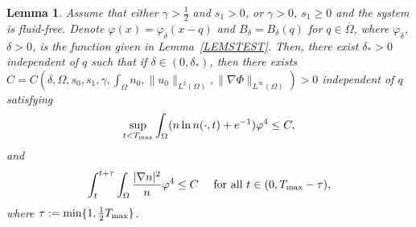 \documentclass{amsart}
\newtheorem{lemma}[defn]{Lemma}
\numberwithin{equation}{section}
\begin{document}
\begin{lemma}\label{LEMLOGL}
Assume that either $\gamma>\frac{1}{2}$ and $s_{1}>0$, or  $\gamma>0$,  $s_{1}\ge0$ and the system is fluid-free.
Denote $\varphi(x)=\varphi_{\delta}(x-q)$ and $B_{\delta}=B_{\delta}(q)$  for $q\in\overline{\Omega}$, where $\varphi_{\delta}$, $\delta>0$,  is the function given in   Lemma~\ref{LEMSTEST}.  Then, there exist   $\delta_{*}>0$ independent of $q $ such that if $\delta \in (0, \delta_{*})$, then there exists 
   $C=C(\delta, \Omega, s_0, s_1, \gamma, \int_{\Omega}n_0, \|u_0\|_{L^2(\Omega)}, \allowbreak\|\nabla \Phi\|_{L^{\infty}(\Omega)})>0$ independent of $q $  satisfying
\[
\sup_{t<T_{\rm max}} \int_{\Omega}  (n\ln n(\cdot,t) +e^{-1})\varphi^{4}\le C,
\]
and 
\[
\int_{t}^{t+\tau}\int_{\Omega}\frac{|\nabla n|^{2}}{n}\varphi^{4} \le C\quad\mbox{ for all }t\in(0,T_{\rm max}-\tau),
\]
where $\tau:=\min\{1,\frac{1}{2}T_{\rm max}\}$.
\end{lemma}
\end{document}
